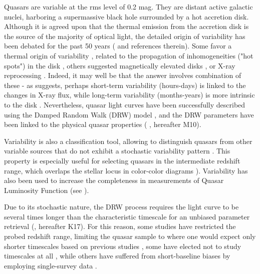 \documentclass[twocolumn]{aastex62}
\begin{document}
Quasars are variable at the rms level of 0.2 mag. They are distant active galactic nuclei, harboring a supermassive black hole surrounded by a hot accretion disk. Although it is agreed upon that the thermal emission from the accretion disk is the source of the majority of optical light, the detailed origin of variability has been debated for the past 50 years (\citealt{sun2018} and references therein). Some favor a thermal origin of variability \citep{kelly2013}, related to the propagation of inhomogeneities ("hot spots") in the disk \citep{dexter2011, cai2016}, others suggested magnetically elevated disks \citep{dexter2019}, or X-ray reprocessing  \citep{kubota2018}.  Indeed, it may well be that the answer involves combination of these -  as \cite{sanchez2018} suggests, perhaps short-term variability (hours-days) is linked to the changes in X-ray flux, while long-term variability (months-years) is more intrinsic to the disk \citep{edelson2015,lira2015}. Nevertheless, quasar light curves have been successfully described using the Damped Random Walk (DRW) model \citep{kelly2009, macleod2010, kozlowski2010, zu2011, kasliwal2015a}, and the DRW parameters have been linked to the physical quasar properties (\citealt{macleod2010} , hereafter M10). 

Variability is also a classification tool, allowing to distinguish quasars from other variable sources that do not exhibit a stochastic variability pattern \citep{macleod2011}. This property is especially useful for selecting quasars in the intermediate redshift range, which overlaps the stellar locus in color-color diagrams \citep{sesar2007, yang2017}). Variability has also been used to increase the completeness in measurements of Quasar Luminosity Function (see \citealt{ ross2013, palanque2013, alsayyad2016, mcgreer2013, mcgreer2018}). 

Due to its stochastic nature, the DRW process requires the light curve to be several times longer than the characteristic timescale for an unbiased parameter retrieval (\citealt{kozlowski2010, kozlowski2017a}, hereafter K17). For this reason, some studies have restricted the probed redshift range, limiting the quasar sample to where one would expect only shorter timescales based on previous studies \citep{sun2018, guo2017}, some have elected not to study timescales at all \citep{sun2018,sanchez2018}, while others have suffered from short-baseline biases by employing single-survey data \citep{hernitschek2016}. 
\end{document}
